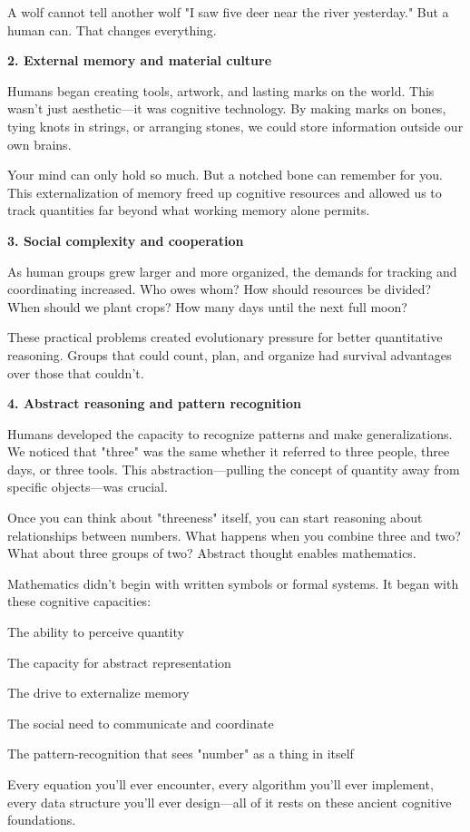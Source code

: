 A wolf cannot tell another wolf "I saw five deer near the river yesterday." But a human can. That changes everything.

\textbf{2. External memory and material culture}

Humans began creating tools, artwork, and lasting marks on the world. This wasn't just aesthetic—it was cognitive technology. By making marks on bones, tying knots in strings, or arranging stones, we could store information outside our own brains.

Your mind can only hold so much. But a notched bone can remember for you. This externalization of memory freed up cognitive resources and allowed us to track quantities far beyond what working memory alone permits.

\textbf{3. Social complexity and cooperation}

As human groups grew larger and more organized, the demands for tracking and coordinating increased. Who owes whom? How should resources be divided? When should we plant crops? How many days until the next full moon?

These practical problems created evolutionary pressure for better quantitative reasoning. Groups that could count, plan, and organize had survival advantages over those that couldn't.

\textbf{4. Abstract reasoning and pattern recognition}

Humans developed the capacity to recognize patterns and make generalizations. We noticed that "three" was the same whether it referred to three people, three days, or three tools. This abstraction—pulling the concept of quantity away from specific objects—was crucial.

Once you can think about "threeness" itself, you can start reasoning about relationships between numbers. What happens when you combine three and two? What about three groups of two? Abstract thought enables mathematics.

\begin{important}
	Mathematics didn't begin with written symbols or formal systems. It began with these cognitive capacities:
	\begin{compactitem}
		\item The ability to perceive quantity
		\item The capacity for abstract representation
		\item The drive to externalize memory
		\item The social need to communicate and coordinate
		\item The pattern-recognition that sees "number" as a thing in itself
	\end{compactitem}
	
	Every equation you'll ever encounter, every algorithm you'll ever implement, every data structure you'll ever design—all of it rests on these ancient cognitive foundations.
\end{important}

